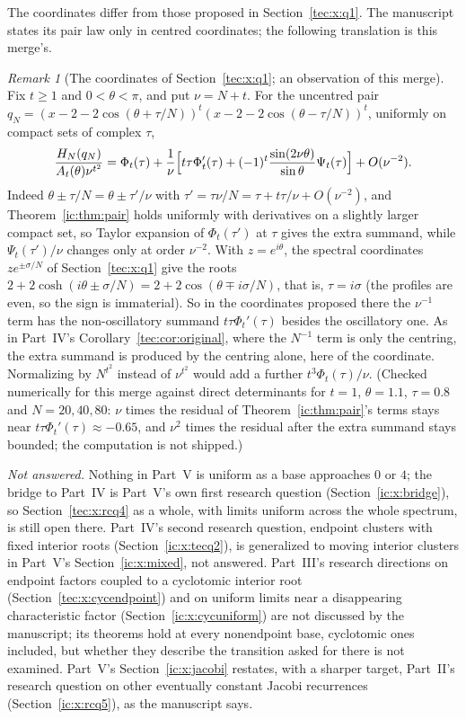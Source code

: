 \documentclass[11pt,a4paper]{article}
\numberwithin{equation}{section}
\theoremstyle{definition}
\theoremstyle{remark}
\newtheorem{remark}[theorem]{Remark}
\begin{document}
The coordinates differ from those proposed in Section~\ref{tec:x:q1}.  The
manuscript states its pair law only in centred coordinates; the following
translation is this merge's.

\begin{remark}[The coordinates of Section~\ref{tec:x:q1}; an observation of
this merge]\label{ic:rem:coordinates}
Fix $t\ge1$ and $0<\theta<\pi$, and put $\nu=N+t$.  For the uncentred pair
$q_N=(x-2-2\cos(\theta+\tau/N))^t(x-2-2\cos(\theta-\tau/N))^t$, uniformly on
compact sets of complex $\tau$,
\[
 \frac{H_N(q_N)}{A_t(\theta)\nu^{t^2}}
 =\Phi_t(\tau)+\frac1\nu\Bigl[t\tau\Phi_t'(\tau)
   +(-1)^t\frac{\sin(2\nu\theta)}{\sin\theta}\Psi_t(\tau)\Bigr]
 +O(\nu^{-2}).
\]
Indeed $\theta\pm\tau/N=\theta\pm\tau'/\nu$ with $\tau'=\tau\nu/N
=\tau+t\tau/\nu+O(\nu^{-2})$, and Theorem~\ref{ic:thm:pair} holds uniformly
with derivatives on a slightly larger compact set, so Taylor expansion of
$\Phi_t(\tau')$ at $\tau$ gives the extra summand, while $\Psi_t(\tau')/\nu$
changes only at order $\nu^{-2}$.  With $z=e^{i\theta}$, the spectral
coordinates $ze^{\pm\sigma/N}$ of Section~\ref{tec:x:q1} give the roots
$2+2\cosh(i\theta\pm\sigma/N)=2+2\cos(\theta\mp i\sigma/N)$, that is,
$\tau=i\sigma$ (the profiles are even, so the sign is immaterial).  So in
the coordinates proposed there the $\nu^{-1}$ term has the non-oscillatory
summand $t\tau\Phi_t'(\tau)$ besides the oscillatory one.  As in Part~IV's
Corollary~\ref{tec:cor:original}, where the $N^{-1}$ term is only the
centring, the extra summand is produced by the centring alone, here of the
coordinate.  Normalizing by $N^{t^2}$ instead of $\nu^{t^2}$ would add a
further $t^3\Phi_t(\tau)/\nu$.  (Checked numerically for this merge against
direct determinants for $t=1$, $\theta=1.1$, $\tau=0.8$ and $N=20,40,80$:
$\nu$ times the residual of Theorem~\ref{ic:thm:pair}'s terms stays near
$t\tau\Phi_t'(\tau)\approx-0.65$, and $\nu^2$ times the residual after the
extra summand stays bounded; the computation is not shipped.)
\end{remark}

\emph{Not answered.}  Nothing in Part~V is uniform as a base approaches $0$
or $4$; the bridge to Part~IV is Part~V's own first research question
(Section~\ref{ic:x:bridge}), so Section~\ref{tec:x:rcq4} as a whole, with
limits uniform across the whole spectrum, is still open there.  Part~IV's
second research question, endpoint clusters with fixed interior roots
(Section~\ref{ic:x:tecq2}), is generalized to moving interior clusters in
Part~V's Section~\ref{ic:x:mixed}, not answered.  Part~III's research
directions on endpoint factors coupled to a cyclotomic interior root
(Section~\ref{tec:x:cycendpoint}) and on uniform limits near a disappearing
characteristic factor (Section~\ref{ic:x:cycuniform}) are not discussed by
the manuscript; its theorems hold at every nonendpoint base, cyclotomic ones
included, but whether they describe the transition asked for there is not
examined.  Part~V's Section~\ref{ic:x:jacobi} restates, with a sharper
target, Part~II's research question on other eventually constant Jacobi
recurrences (Section~\ref{ic:x:rcq5}), as the manuscript says.
\end{document}
